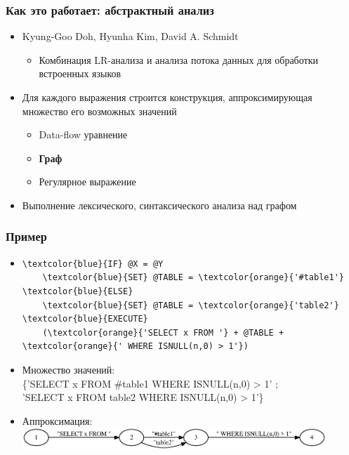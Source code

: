 \documentclass{beamer}
\begin{document}
\begin{frame}[fragile]
	\transwipe[direction=90]
	\frametitle{Как это работает: абстрактный анализ }
	\begin{itemize}
    	\item Kyung-Goo Doh, Hyunha Kim, David A. Schmidt
    	\begin{itemize}
    		\item Комбинация LR-анализа и анализа потока данных для обработки встроенных языков
        \end{itemize}
	    \item Для каждого выражения строится конструкция, аппроксимирующая множество его возможных значений
    	\begin{itemize}
    		\item Data-flow уравнение
        	\item \textbf{Граф}
        	\item Регулярное выражение
        \end{itemize}
	    \item Выполнение лексического, синтаксического анализа над графом
    \end{itemize}
\end{frame}

\begin{frame}[fragile]
	\transwipe[direction=90]
	\frametitle{Пример}
		\begin{itemize}
	\item
		\begin{Verbatim}[commandchars=\\\{\}]
\textcolor{blue}{IF} @X = @Y
    \textcolor{blue}{SET} @TABLE = \textcolor{orange}{'#table1'}
\textcolor{blue}{ELSE}
    \textcolor{blue}{SET} @TABLE = \textcolor{orange}{'table2'}
\textcolor{blue}{EXECUTE} 
    (\textcolor{orange}{'SELECT x FROM '} + @TABLE + \textcolor{orange}{' WHERE ISNULL(n,0) > 1'})
		\end{Verbatim}
     	\item Множество значений: \\ \{'SELECT x FROM \#table1 WHERE ISNULL(n,0) > 1' ; \\ \vspace{2pt} 'SELECT x FROM table2 WHERE ISNULL(n,0) > 1'\}
    	\item Аппроксимация: 
                \includegraphics[width = 0.9\textwidth]{picts/approximation1.eps}

	\end{itemize}

\end{frame}
\end{document}
